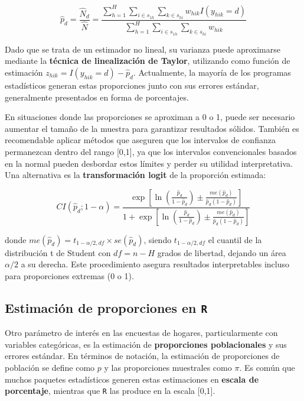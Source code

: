 \documentclass[
  12pt,
]{book}
\begin{document}
\[\hat{p}_d = \frac{\hat{N}_d}{\hat{N}} = \frac{\displaystyle\sum_{h=1}^{H} \sum_{i \in s_{1h}} \sum_{k \in s_{hi}} w_{hik} I(y_{hik}=d)} {\displaystyle\sum_{h=1}^{H} \sum_{i \in s_{1h}} \sum_{k \in s_{hi}} w_{hik}}\]

Dado que se trata de un estimador no lineal, su varianza puede aproximarse mediante la \textbf{técnica de linealización de Taylor}, utilizando como función de estimación \(z_{hik}=I(y_{hik}=d)-\hat{p}_d\). Actualmente, la mayoría de los programas estadísticos generan estas proporciones junto con sus errores estándar, generalmente presentados en forma de porcentajes.

En situaciones donde las proporciones se aproximan a 0 o 1, puede ser necesario aumentar el tamaño de la muestra para garantizar resultados sólidos. También es recomendable aplicar métodos que aseguren que los intervalos de confianza permanezcan dentro del rango {[}0,1{]}, ya que los intervalos convencionales basados en la normal pueden desbordar estos límites y perder su utilidad interpretativa. Una alternativa es la \textbf{transformación logit} de la proporción estimada:

\[CI(\hat{p}_d; 1-\alpha) = \frac{\exp \left[\ln\left(\frac{\hat{p}_d}{1-\hat{p}_d}\right) \pm \frac{me(\hat{p}_d)}{\hat{p}_d(1-\hat{p}_d)}\right]}{1 + \exp \left[\ln\left(\frac{\hat{p}_d}{1-\hat{p}_d}\right) \pm \frac{me(\hat{p}_d)}{\hat{p}_d(1-\hat{p}_d)}\right]}\]

donde \(me(\hat{p}_d) = t_{1-\alpha/2, df} \times se(\hat{p}_d)\), siendo \(t_{1-\alpha/2, df}\) el cuantil de la distribución t de Student con \(df = n - H\) grados de libertad, dejando un área \(\alpha/2\) a su derecha. Este procedimiento asegura resultados interpretables incluso para proporciones extremas (0 o 1).

\subsection{\texorpdfstring{Estimación de proporciones en \texttt{R}}{Estimación de proporciones en R}}\label{estimaciuxf3n-de-proporciones-en-r}

Otro parámetro de interés en las encuestas de hogares, particularmente con variables categóricas, es la estimación de \textbf{proporciones poblacionales} y sus errores estándar. En términos de notación, la estimación de proporciones de población se define como \(p\) y las proporciones muestrales como \(\pi\). Es común que muchos paquetes estadísticos generen estas estimaciones en \textbf{escala de porcentaje}, mientras que \texttt{R} las produce en la escala {[}0,1{]}.
\end{document}
